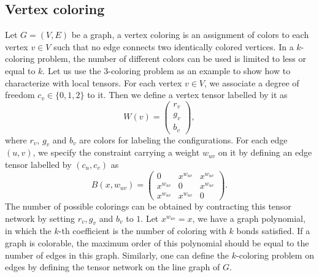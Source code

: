 \documentclass[onefignum, onetabnum]{siamart190516}
\newcommand{\<}{\langle}
\renewcommand{\>}{\rangle}
\newcounter{example}
\begin{document}
\subsection{Vertex coloring}
Let $G=(V,E)$ be a graph, a vertex coloring is an assignment of colors to each vertex $v\in V$ such that no edge connects two identically colored vertices. 
In a $k$-coloring problem, the number of different colors can be used is limited to less or equal to $k$.
Let us use the 3-coloring problem as an example to show how to characterize with local tensors.
For each vertex $v \in V$, we associate a degree of freedom $c_v\in\{0,1,2\}$ to it.
Then we define a vertex tensor labelled by it as
\begin{equation}
    W(v) = \left(\begin{matrix}
        r_v\\
        g_v\\
        b_v
    \end{matrix}\right),
\end{equation}
where $r_v$, $g_v$ and $b_v$ are colors for labeling the configurations.
For each edge $(u, v)$, we specify the constraint carrying a weight $w_{uv}$ on it by defining an edge tensor labelled by $(c_u, c_v)$ as
\begin{equation}
    B(x, w_{uv}) = \left(\begin{matrix}
        0 & x^{w_{uv}} & x^{w_{uv}}\\
        x^{w_{uv}} & 0 & x^{w_{uv}}\\
        x^{w_{uv}} & x^{w_{uv}} & 0
    \end{matrix}\right).
\end{equation}
The number of possible colorings can be obtained by contracting this tensor network by setting $r_v, g_v$ and $b_v$ to $1$.
Let $x^{w_{uv}} = x$, we have a graph polynomial,
in which the $k$-th coefficient is the number of coloring with $k$ bonds satisfied.
If a graph is colorable, the maximum order of this polynomial should be equal to the number of edges in this graph.
Similarly, one can define the $k$-coloring problem on edges by defining the tensor network on the line graph of $G$.
\end{document}
